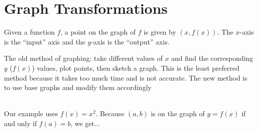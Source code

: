 \documentclass[twoside]{tufte-handout}
\theoremstyle{ekimcustom}
\begin{document}
\section{Graph Transformations}
Given a function $f$, a point on the graph of $f$ is given by $(x,f(x))$.    The $x$-axis is the ``input'' axis and the $y$-axis is the ``output'' axis.   

The old method of graphing: take different values of $x$ and find the corresponding $y$ ($f(x)$) values, plot points, then sketch a graph. This is the least preferred method because it takes too much time and is not accurate. The new method is to use base graphs and modify them accordingly




\\Our example uses $f(x)=x^2$. Because $(a,b)$ is on the graph of $y=f(x)$ if and only if $f(a)=b$, we get...
\end{document}
